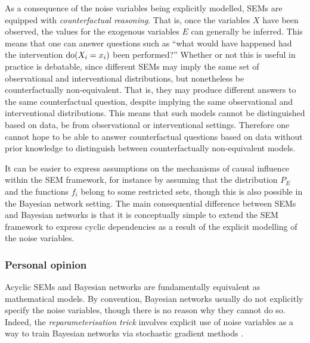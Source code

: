 As a consequence of the noise variables being explicitly modelled, SEMs are equipped with \emph{counterfactual reasoning}. 
That is, once the variables $X$ have been observed, the values for the exogenous variables $E$ can generally be inferred. 
This means that one can answer questions such as ``what would have happened had the intervention $\operatorname{do}(X_i=x_i)$ been performed?''
Whether or not this is useful in practice is debatable, since different SEMs may imply the same set of observational and interventional distributions, but nonetheless be counterfactually non-equivalent. That is, they may produce different answers to the same counterfactual question, despite implying the same observational and interventional distributions. This means that such models cannot be distinguished based on data, be from observational or interventional settings. Therefore one cannot hope to be able to answer counterfactual questions based 
on data without prior knowledge to distinguish between counterfactually non-equivalent models.

It can be easier to express assumptions on the mechanisms of causal influence within the SEM framework, for instance by assuming that the distribution $P_E$ and the functions $f_i$ belong to some restricted sets, though this is also possible in the Bayesian network setting.
The main consequential difference between SEMs and Bayesian networks is that it is conceptually simple to extend the SEM framework to express cyclic dependencies as a result of the explicit modelling of the noise variables.



\subsubsection{Personal opinion}

Acyclic SEMs and Bayesian networks are fundamentally equivalent as mathematical models.
By convention, Bayesian networks usually do not explicitly specify the noise variables, though there is no reason why they cannot do so.
Indeed, the \emph{reparameterisation trick} involves explicit use of noise variables as a way to train Bayesian networks via stochastic gradient methods \citep{kingma2013auto,rezende2014stochastic}.

